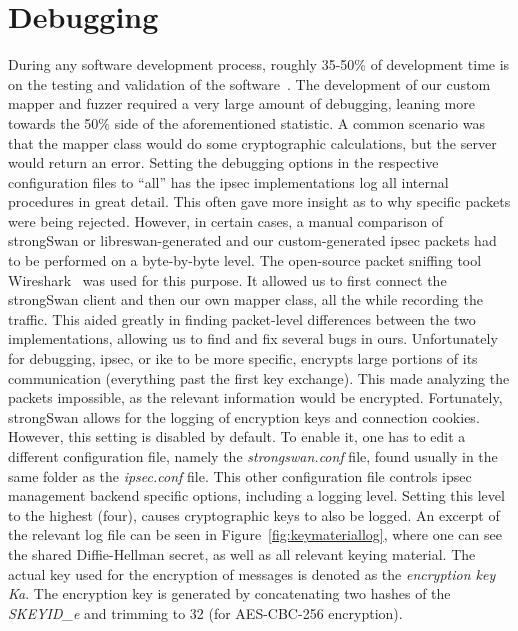 \section{Debugging}
During any software development process, roughly 35-50\% of development time is on the testing and validation of the software~\cite{britton2013reversible}. The development of our custom mapper and fuzzer required a very large amount of debugging, leaning more towards the 50\% side of the aforementioned statistic. A common scenario was that the mapper class would do some cryptographic calculations, but the server would return an error. Setting the debugging options in the respective configuration files to ``all'' has the \ac{ipsec} implementations log all internal procedures in great detail. This often gave more insight as to why specific packets were being rejected. However, in certain cases, a manual comparison of strongSwan or libreswan-generated and our custom-generated \ac{ipsec} packets had to be performed on a byte-by-byte level. The open-source packet sniffing tool Wireshark~\cite{doc:wireshark} was used for this purpose. It allowed us to first connect the strongSwan client and then our own mapper class, all the while recording the traffic. This aided greatly in finding packet-level differences between the two implementations, allowing us to find and fix several bugs in ours. Unfortunately for debugging, \ac{ipsec}, or \ac{ike} to be more specific, encrypts large portions of its communication (everything past the first key exchange). This made analyzing the packets impossible, as the relevant information would be encrypted. Fortunately, strongSwan allows for the logging of encryption keys and connection cookies. However, this setting is disabled by default. To enable it, one has to edit a different configuration file, namely the \emph{strongswan.conf} file, found usually in the same folder as the \emph{ipsec.conf} file. This other configuration file controls \ac{ipsec} management backend specific options, including a logging level. Setting this level to the highest (four), causes cryptographic keys to also be logged. An excerpt of the relevant log file can be seen in Figure~\ref{fig:keymateriallog}, where one can see the shared Diffie-Hellman secret, as well as all relevant keying material. The actual key used for the encryption of messages is denoted as the \emph{encryption key Ka}. The encryption key is generated by concatenating two hashes of the \emph{SKEYID\_e} and trimming to \SI{32}{\byte} (for AES-CBC-256 encryption). 

